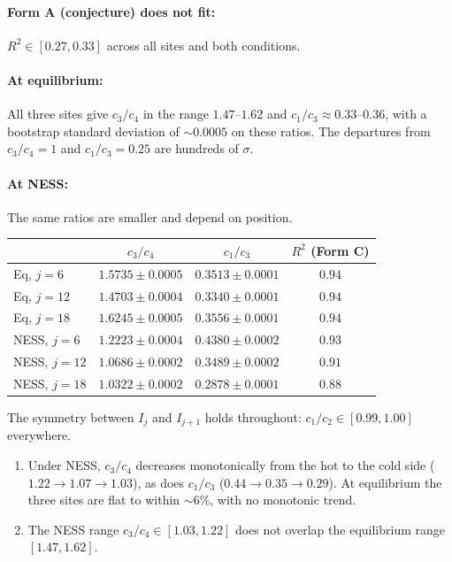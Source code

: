 \documentclass[11pt]{article}
\begin{document}
\paragraph{Form A (conjecture) does not fit:} $R^2 \in [0.27, 0.33]$ across
all sites and both conditions.

\paragraph{At equilibrium:} All three sites give $c_3/c_4$ in the range
$1.47$--$1.62$ and $c_1/c_3 \approx 0.33$--$0.36$, with a bootstrap standard
deviation of ${\sim}0.0005$ on these ratios. The departures from $c_3/c_4=1$ and
$c_1/c_3=0.25$ are hundreds of $\sigma$.

\paragraph{At NESS:} The same ratios are smaller and depend on position.

\begin{center}
\begin{tabular}{lccc}
\toprule
 & $c_3/c_4$ & $c_1/c_3$ & $R^2$ (Form C) \\
\midrule
Eq, $j=6$  & $1.5735 \pm 0.0005$ & $0.3513 \pm 0.0001$ & $0.94$ \\
Eq, $j=12$ & $1.4703 \pm 0.0004$ & $0.3340 \pm 0.0001$ & $0.94$ \\
Eq, $j=18$ & $1.6245 \pm 0.0005$ & $0.3556 \pm 0.0001$ & $0.94$ \\[2pt]
NESS, $j=6$  & $1.2223 \pm 0.0004$ & $0.4380 \pm 0.0002$ & $0.93$ \\
NESS, $j=12$ & $1.0686 \pm 0.0002$ & $0.3489 \pm 0.0002$ & $0.91$ \\
NESS, $j=18$ & $1.0322 \pm 0.0002$ & $0.2878 \pm 0.0001$ & $0.88$ \\
\bottomrule
\end{tabular}
\end{center}

The symmetry between $I_j$ and $I_{j+1}$ holds throughout:
$c_1/c_2 \in [0.99, 1.00]$ everywhere.

\begin{enumerate}
\item Under NESS, $c_3/c_4$ decreases monotonically from the hot to the cold
side ($1.22 \to 1.07 \to 1.03$), as does $c_1/c_3$ ($0.44 \to 0.35 \to 0.29$).
At equilibrium the three sites are flat to within ${\sim}6\%$, with no
monotonic trend.
\item The NESS range $c_3/c_4\in[1.03,1.22]$ does not overlap the equilibrium
range $[1.47,1.62]$.
\end{enumerate}
\end{document}
